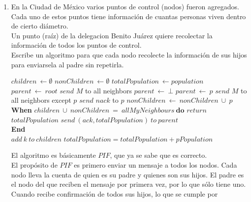 \documentclass[12pt,a4paper]{report}
\begin{document}
\begin{enumerate}
		\item {
			En la Ciudad de México varios puntos de control (nodos) fueron agregados.\\
			Cada uno de estos puntos tiene información de cuantas personas viven
			dentro de cierto diámetro. \\
			Un punto (raíz) de la delegacion Benito Juárez quiere recolectar la
			información de todos los puntos de control. \\
			Escribe un algoritmo para que cada nodo recolecte la información de sus
			hijos para enviarsela al padre sin repetirla.\\

			\begin{algorithmic}[1]
					\State $children \ \leftarrow \emptyset$
					\State $nonChildren \ \leftarrow \emptyset$
					\State $totalPopulation \ \leftarrow population$
						\State $parent\ \leftarrow\ root$
						\State $send$ $M$ to all neighbors
					\Else
						\State $parent\ \leftarrow\ \bot$
					\EndIf
					\State {}
					\Start
							\State $parent\ \leftarrow\ p$
							\State $send$ $M$ to all neighbors except $p$
						\Else
							\State $send$ $nack$ to $p$
						\EndIf
					\End
					\State {}
					\Start
						\State $nonChildren\ \leftarrow\ nonChildren\ \cup\ {p}$
					\End\\
					\textbf{When} $children\ \cup\ nonChildren\ =\ allMyNeighbours
							\	\textbf{do}$
					\Start
							\State $return$ $totalPopulation$
						\Else
							\State $send\ (ack, totalPopulation)\ to\ parent$
						\EndIf\\
					\textbf{End}\\
					\Start
						\State $add\ k\ to\ children$
						\State $totalPopulation = totalPopulation + pPopulation$
					\End
					\End
				\EndFunction
			\end{algorithmic}
			El algoritmo es básicamente $PIF$, que ya se sabe que es correcto. \\
			El propósito de $PIF$ es primero enviar
			un mensaje a todos los nodos. Cada nodo lleva la cuenta de quien es su
			padre y quienes son sus hijos. El padre es el nodo del que reciben el mensaje
			por primera vez, por lo que sólo tiene uno.\\
			Cuando recibe confirmación de todos sus hijos, lo que se cumple por
}
\end{enumerate}
\end{document}
